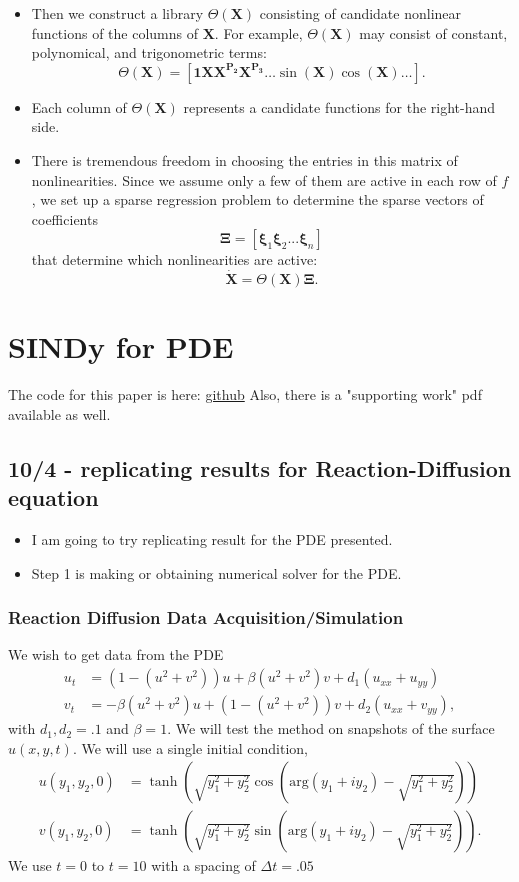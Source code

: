 \documentclass[12pt]{article}
\newcounter{problem}
\begin{document}
\begin{itemize}
\[        \]
    \item Then we construct a library $\Theta(\bm{X})$ consisting of candidate nonlinear functions of the columns of $\bm{X}$. For example, $\Theta(\bm{X})$ may consist of constant, polynomical, and trigonometric terms:
        \[
            \Theta(\bm{X}) = \left[ \bm{1} \bm{X} \bm{X^{P_2}} \bm{X^{P_3}} \dots \sin(\bm{X}) \cos(\bm{X}) \dots \right].
        \]
    \item Each column of $\Theta(\bm{X})$ represents a candidate functions for the right-hand side.
    \item There is tremendous freedom in choosing the entries in this matrix of nonlinearities. Since we assume only a few of them are active in each row of $f$, we set up a sparse regression problem to determine the sparse vectors of coefficients
        \[
            \bm{\Xi} = \left[ \bm{\xi}_1 \bm{\xi}_2 ... \bm{\xi}_n\right]
        \] 
        that determine which nonlinearities are active:
        \[
            \dot{\bm{X}} = \Theta(\bm{X})\bm{\Xi}.
        \] 
       \end{itemize}
\section{SINDy for PDE}
The code for this paper is here: \href{https://github.com/kpchamp/SindyAutoencoders}{github}
Also, there is a "supporting work" pdf available as well.

\subsection{10/4 - replicating results for Reaction-Diffusion equation}
\begin{itemize}
    \item I am going to try replicating result for the PDE presented.
    \item Step 1 is making or obtaining numerical solver for the PDE.
\end{itemize}
\subsubsection{Reaction Diffusion Data Acquisition/Simulation}
We wish to get data from the PDE
\begin{align*}
    u_t &= \left(1-(u^2+v^2) \right)u + \beta(u^2+v^2)v + d_1(u_{xx}+u_{yy})\\
    v_t &= -\beta(u^2+v^2)u + \left(1-(u^2+v^2)\right)v + d_2(u_{xx}+v_{yy}),
\end{align*}
with $d_1,d_2=.1$ and $\beta = 1$.
We will test the method on snapshots of the surface $u(x,y,t)$.
We will use a single initial condition,
\begin{align*}
    u(y_1,y_2,0)&= \tanh\left(\sqrt{y_1^2+y_2^2}\cos\left(\text{arg}(y_1+iy_2)-\sqrt{y_1^2+y_2^2}\right)\right)\\
    v(y_1,y_2,0) &= \tanh\left(\sqrt{y_1^2+y_2^2}\sin\left(\text{arg}(y_1+iy_2)-\sqrt{y_1^2+y_2^2}\right)\right).
\end{align*}
We use $t=0$ to $t=10$ with a spacing of $\Delta t = .05$
\end{document}
